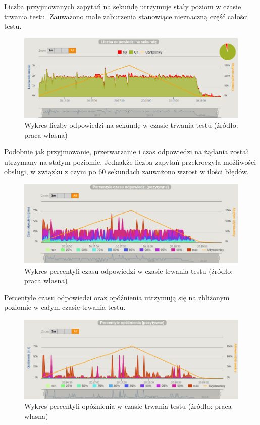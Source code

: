 \documentclass[12pt,twoside]{article}
\begin{document}
Liczba przyjmowanych zapytań na sekundę utrzymuje stały poziom w czasie
trwania testu. Zauważono małe zaburzenia stanowiące nieznaczną część
całości testu.

\begin{figure}[htbp]
\centering
\includegraphics[resolution=150]{test_results/js/simpletest/screenshots/responses.png}
\caption{Wykres liczby odpowiedzi na sekundę w czasie trwania testu (źródło: praca własna)}
\end{figure}

Podobnie jak przyjmowanie, przetwarzanie i czas odpowiedzi na żądania
został utrzymany na stałym poziomie. Jednakże liczba zapytań
przekroczyła możliwości obsługi, w związku z czym po 60 sekundach
zauważono wzrost w ilości błędów.

\begin{figure}[htbp]
\centering
\includegraphics[resolution=150]{test_results/js/simpletest/screenshots/response_percentile.png}
\caption{Wykres percentyli czasu odpowiedzi w czasie trwania testu (źródło: praca własna)}
\end{figure}

Percentyle czasu odpowiedzi oraz opóźnienia utrzymują się na zbliżonym
poziomie w całym czasie trwania testu.

\begin{figure}[htbp]
\centering
\includegraphics[resolution=150]{test_results/js/simpletest/screenshots/latency_percentile.png}
\caption{Wykres percentyli opóźnienia w czasie trwania testu (źródło: praca własna)}
\end{figure}
\end{document}
